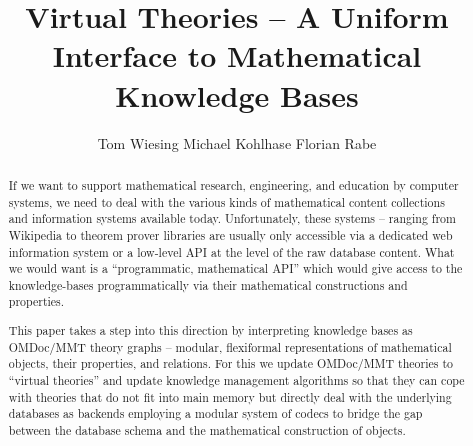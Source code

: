 \documentclass{llncs}
\title{Virtual Theories -- A Uniform Interface to Mathematical Knowledge Bases}
\author{
Tom Wiesing\inst{1}
Michael Kohlhase\inst{1} 
Florian Rabe\inst{2} 
}
\institute{
   FAU Erlangen-N\"urnberg
   \and Jacobs University Bremen
}
\providecommand{\ommt}{\textsf{OMDoc}/\textsf{MMT}\xspace}
\begin{document}
\maketitle
\begin{abstract}
  If we want to support mathematical research, engineering, and education by computer systems, we need to deal with the various kinds of mathematical content collections and information systems available today. Unfortunately, these systems -- ranging from Wikipedia to theorem prover libraries are usually only accessible via a dedicated web information system or a low-level API at the level of the raw database content.  What we would want is a ``programmatic, mathematical API'' which would give access to the knowledge-bases programmatically via their mathematical constructions and properties.

  This paper takes a step into this direction by interpreting knowledge bases as \ommt theory graphs -- modular, flexiformal representations of mathematical objects, their properties, and relations. 
  For this we update \ommt theories to ``virtual theories'' and update knowledge management algorithms so that they can cope with theories that do not fit into main memory but directly deal with the underlying databases as backends employing a modular system of codecs to bridge the gap between the database schema and the mathematical construction of objects.
\end{abstract}







\printbibliography
\end{document}
